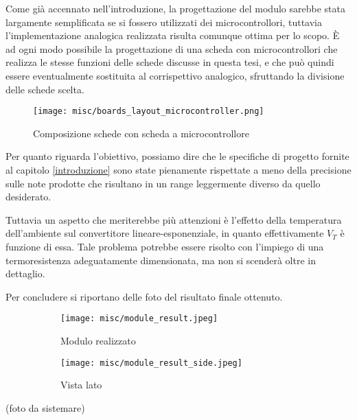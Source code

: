 Come già accennato nell'introduzione, la progettazione del modulo sarebbe stata largamente
semplificata se si fossero utilizzati dei microcontrollori, tuttavia l'implementazione
analogica realizzata risulta comunque ottima per lo scopo. È ad ogni modo possibile la
progettazione di una scheda con microcontrollori che realizza le stesse funzioni delle schede
discusse in questa tesi, e che può quindi essere eventualmente sostituita al corrispettivo
analogico, sfruttando la divisione delle schede scelta.

\begin{figure}[H]
    \centering
    \texttt{[image: misc/boards\_layout\_microcontroller.png]}
    \caption{Composizione schede con scheda a microcontrollore}
    \label{boards_layout_microcontroller}
\end{figure}

Per quanto riguarda l'obiettivo, possiamo dire che le specifiche di progetto fornite al
capitolo \ref{introduzione} sono state pienamente rispettate a meno della precisione sulle
note prodotte che risultano in un range leggermente diverso da quello desiderato.


Tuttavia un aspetto che meriterebbe più attenzioni è l'effetto della temperatura dell'ambiente
sul convertitore lineare-esponenziale, in quanto effettivamente $V_T$ è funzione di essa.
Tale problema potrebbe essere risolto con l'impiego di una termoresistenza adeguatamente
dimensionata, ma non si scenderà oltre in dettaglio.


\newpage
{}


Per concludere si riportano delle foto del risultato finale ottenuto.

\begin{figure}[H]
    \centering

    \begin{subfigure}{.5\textwidth}
        \centering
        \texttt{[image: misc/module\_result.jpeg]}
        \caption{Modulo realizzato}
        \label{module_result}
    \end{subfigure}%
    \begin{subfigure}{.5\textwidth}
        \centering
        \texttt{[image: misc/module\_result\_side.jpeg]}
        \caption{Vista lato}
        \label{module_result_side}
    \end{subfigure}

    \caption*{}
\end{figure}

(foto da sistemare)

